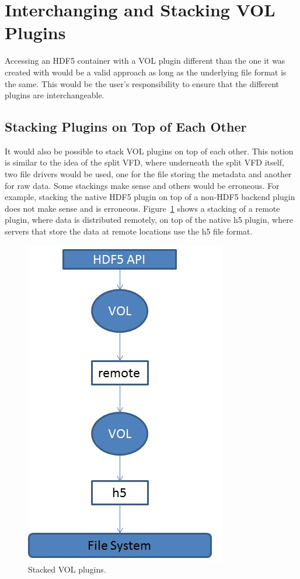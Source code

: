 \section{Interchanging and Stacking VOL Plugins}
\label{sec:stack}

Accessing an HDF5 container with a VOL plugin different than the one
it was created with would be a valid approach as long as the
underlying file format is the same. This would be the user’s
responsibility to ensure that the different plugins are
interchangeable.

\subsection{Stacking Plugins on Top of Each Other}
It would also be possible to stack VOL plugins on top of each
other. This notion is similar to the idea of the split VFD, where
underneath the split VFD itself, two file drivers would be used, one
for the file storing the metadata and another for raw data. Some
stackings make sense and others would be erroneous. For example,
stacking the native HDF5 plugin on top of a non-HDF5 backend plugin
does not make sense and is erroneous. Figure~\ref{fig:stack} shows a
stacking of a remote plugin, where data is distributed remotely, on
top of the native h5 plugin, where servers that store the data at
remote locations use the h5 file format.

\begin{figure}[ht!]
\centering
\includegraphics[scale=0.75]{stacked.jpg}
\caption{Stacked VOL plugins.}
\label{fig:stack}
\end{figure}


